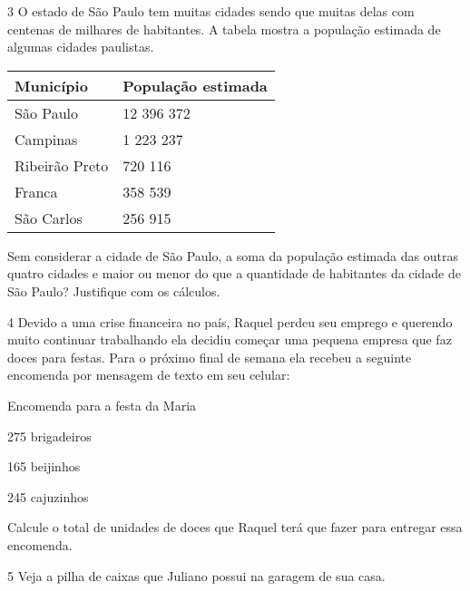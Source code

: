 

\num{3} O estado de São Paulo tem muitas cidades sendo que muitas delas com
centenas de milhares de habitantes. A tabela mostra a população estimada
de algumas cidades paulistas.

\begin{longtable}[]{@{}ll@{}}
\toprule
Município & População estimada\tabularnewline
\midrule
\endhead
São Paulo & 12 396 372\tabularnewline
Campinas & 1 223 237\tabularnewline
Ribeirão Preto & 720 116\tabularnewline
Franca & 358 539\tabularnewline
São Carlos & 256 915\tabularnewline
\bottomrule
\end{longtable}


Sem considerar a cidade de São Paulo, a soma da população estimada das
outras quatro cidades e maior ou menor do que a quantidade de habitantes
da cidade de São Paulo? Justifique com os cálculos.



\num{4} Devido a uma crise financeira no país, Raquel perdeu seu emprego e
querendo muito continuar trabalhando ela decidiu começar uma pequena
empresa que faz doces para festas. Para o próximo final de semana ela
recebeu a seguinte encomenda por mensagem de texto em seu celular:


Encomenda para a festa da Maria

275 brigadeiros

165 beijinhos

245 cajuzinhos

Calcule o total de unidades de doces que Raquel terá que fazer para
entregar essa encomenda.



\num{5} Veja a pilha de caixas que Juliano possui na garagem de sua casa.


